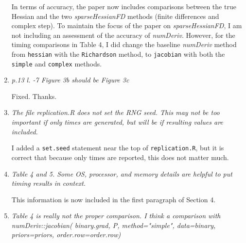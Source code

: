 \documentclass{article}
\newcommand{\pkg}[1]{\emph{#1}}
\newcommand{\filename}[1]{\texttt{#1}}
\newcommand{\code}[1]{\texttt{#1}}
\newcommand{\func}[1]{\code{#1}}
\newcommand{\class}[1]{\textsl{#1}}
\newcommand{\method}[1]{\func{#1}}
\newenvironment{revQuote}{\itshape}{\vspace{\baselineskip}}
\newenvironment{response}{\normalfont}{\vspace{\baselineskip}}
\begin{document}
\begin{enumerate}[align=left]
\begin{response}
In terms of accuracy, the paper now includes comparisons between the true
Hessian and the two \class{sparseHessianFD} methods (finite differences
and complex step). To maintain the focus of the paper on
\pkg{sparseHessianFD}, I am not including an assessment of the accuracy of
\pkg{numDeriv}.  However, for the
timing comparisons in Table 4, I did
change the baseline \pkg{numDeriv} method from \func{hessian} with the
\method{Richardson} method, to \func{jacobian} with both the
\method{simple} and 
\method{complex} methods.



\end{response}


\item \begin{revQuote}
 p.13  l. -7  Figure 3b  should be Figure 3c
  \end{revQuote}

\begin{response}
  Fixed.  Thanks.
\end{response}


\item \begin{revQuote}
 The file replication.R does not set the RNG seed. This may not be too
important if only times are generated, but will be if resulting values are
included.
    
  \end{revQuote}

\begin{response}
  I added a \func{set.seed} statement near the top of
  \filename{replication.R}, but it is correct that because only
  times are reported, this does not matter much.
\end{response}


\item \begin{revQuote}
Table 4 and 5. Some OS, processor, and memory details are helpful to put
timing results in context.
  \end{revQuote}

\begin{response}
  This information is now included in the first paragraph of Section 4.
\end{response}


\item\begin{revQuote}
Table 4 is really not the proper comparison. I think a comparison with
       numDeriv::jacobian( binary.grad, P, method="simple", 
                   data=binary, priors=priors,
order.row=order.row)


\end{revQuote}
\end{enumerate}
\end{document}
